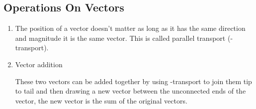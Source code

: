 \documentclass{article}
\begin{document}
\subsection*{Operations On Vectors}

\begin{enumerate}
\item The position of a vector doesn't matter as long as it has the same direction and magnitude it is the same vector. This is called parallel transport (\textbar\textbar-transport).
\item Vector addition

\begin{center}
\end{center}
These two vectors can be added together by using \textbar\textbar-transport to join them tip to tail and then drawing a new vector between the unconnected ends of the vector, the new vector is the sum of the original vectors.


\end{enumerate}
\end{document}
